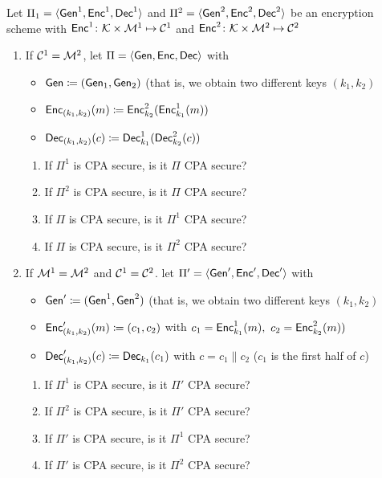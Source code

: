 \documentclass[12pt]{article}
\begin{document}
Let $\Pi_1=\langle \Gen^1,\Enc^1,\Dec^1\rangle$ and $\Pi^2=\langle \Gen^2,\Enc^2,\Dec^2\rangle$ be an encryption scheme with $\Enc^1 \colon \K\times \M^1 \mapsto \C^1$ and $\Enc^2 \colon \K\times \M^2 \mapsto \C^2$
\begin{enumerate}
\item If $\C^1 = \M^2$, let $\Pi=\langle \Gen,\Enc,\Dec\rangle$ with
\begin{itemize}
  \item $\Gen\define(\Gen_1,\Gen_2)$ (that is, we obtain two different keys $(k_1,k_2)$
  \item $\Enc_{(k_1,k_2)}(m)\define\Enc_{k_2}^2(\Enc^1_{k_1}(m))$
  \item $\Dec_{(k_1,k_2)}(c)\define\Dec^1_{k_1}(\Dec^2_{k_2}(c))$
\end{itemize}

\begin{enumerate}
\item If $\Pi^1$ is CPA secure, is it $\Pi$ CPA secure?
\item If $\Pi^2$ is CPA secure, is it $\Pi$ CPA secure?
\item If $\Pi$ is CPA secure, is it $\Pi^1$ CPA secure?
\item If $\Pi$ is CPA secure, is it $\Pi^2$ CPA secure?
\end{enumerate}
\item If $\M^1 = \M^2$ and $\C^1 = \C^2$. let $\Pi'=\langle \Gen',\Enc',\Dec'\rangle$ with
\begin{itemize}
  \item $\Gen' \define (\Gen^1,\Gen^2)$ (that is, we obtain two different keys $(k_1,k_2)$
  \item $\Enc'_{(k_1,k_2)}(m) \define (c_1,c_2)$ with $c_1=\Enc^1_{k_1}(m),~c_2=\Enc^2_{k_2}(m))$
  \item $\Dec'_{(k_1,k_2)}(c) \define \Dec_{k_1}(c_1)$ with $c=c_1\|c_2$ ($c_1$ is the first half of $c$)
\end{itemize}

\begin{enumerate}
\item If $\Pi^1$ is CPA secure, is it $\Pi'$ CPA secure?
\item If $\Pi^2$ is CPA secure, is it $\Pi'$ CPA secure?
\item If $\Pi'$ is CPA secure, is it $\Pi^1$ CPA secure?
\item If $\Pi'$ is CPA secure, is it $\Pi^2$ CPA secure?
\end{enumerate}
\end{enumerate}
\end{document}
